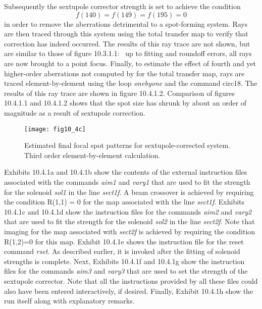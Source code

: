 Subsequently the sextupole corrector strength is set to achieve the
condition
\[
f(140) = f(149) = f(195) = 0
\]
in order to remove the aberrations detrimental to a spot-forming system.
Rays are then traced through this system using the total transfer map to
verify that correction has indeed occurred.  The results of this ray
trace are not shown, but are similar to those of figure 10.3.1.1: \ up to
fitting and roundoff errors, all rays are now brought to a point focus.
Finally, to estimate the effect of fourth and yet higher-order
aberrations not computed by  for the total transfer map, rays
are traced element-by-element using the loop {\em onebyone} and the
command circ18.  The results of this ray trace are shown in figure
10.4.1.2.  Comparison of figures 10.4.1.1 and 10.4.1.2 shows that the spot size
has shrunk by about an order of magnitude as a result of sextupole
correction.

\begin{figure}[htbp]
  \centering
  \texttt{[image: fig10\_4c]}
  \caption{Estimated final focal spot patterns for sextupole-corrected
system.  Third order element-by-element calculation.}
\end{figure}

Exhibits 10.4.1a and 10.4.1b show the contents of the external instruction
files associated with the commands {\em aim1} and {\em vary1} that are
used to fit the strength for the solenoid {\em sol1} in the line {\em
sect1f}.  A beam crossover is achieved by requiring the condition R(1,1)
= 0 for the map associated with the line {\em sect1f}.  Exhibits
10.4.1c and 10.4.1d show the instruction files for the commands {\em
aim2} and {\em vary2} that are used to fit the strength for the solenoid
{\em sol2} in the line {\em sect2f}.  Note that imaging for the map
associated with {\em sect2f} is achieved by requiring the condition
R(1,2)=0 for this map.  Exhibit 10.4.1e shows the instruction file for
the reset command {\em rset}.  As described earlier, it is invoked after
the fitting of solenoid strengths is complete.  Next, Exhibits 10.4.1f
and 10.4.1g show the instruction files for the commands {\em aim3} and
{\em vary3} that are used to set the strength of the sextupole corrector.
Note that all the instructions provided by all these files could also
have been entered interactively, if desired.  Finally, Exhibit 10.4.1h
show the \Mary run itself along with explanatory remarks.

